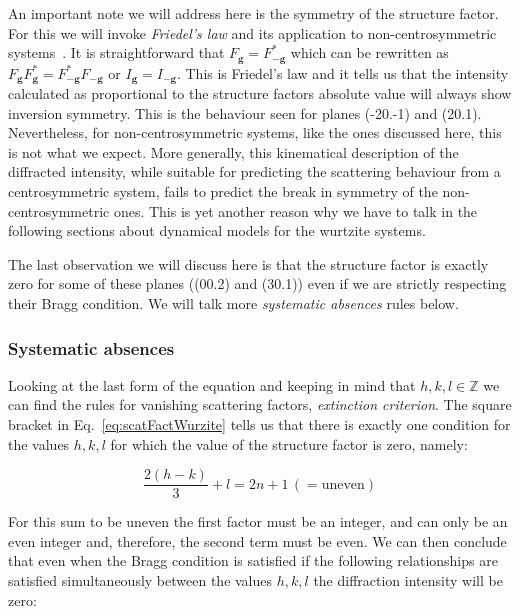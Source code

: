 An important note we will address here is the symmetry of the structure factor. For this we will invoke \textit{Friedel's law} and its application to non-centrosymmetric systems~\cite{Serneels73}. It is straightforward that $F_\mathbf{g}=F^*_{-\mathbf{g}}$ which can be rewritten as $F_\mathbf{g} F^*_\mathbf{g}=F^*_{-\mathbf{g}}F_{-\mathbf{g}}$ or $I_\mathbf{g}=I_\mathbf{-g}$. This is Friedel's law and it tells us that the intensity calculated as proportional to the structure factors absolute value will always show inversion symmetry. This is the behaviour seen for planes \hkl(-20.-1) and \hkl(20.1). Nevertheless, for non-centrosymmetric systems, like the ones discussed here, this is not what we expect. More generally, this kinematical description of the diffracted intensity, while suitable for predicting the scattering behaviour from a centrosymmetric system, fails to predict the break in symmetry of the non-centrosymmetric ones.  This is yet another reason why we have to talk in the following sections about dynamical models for the wurtzite systems. 


The last observation we will discuss here is that the structure factor is exactly zero for some of these planes (\hkl(00.2) and \hkl(30.1)) even if we are strictly respecting their Bragg condition. We will talk more \textit{systematic absences} rules below. 


\subsubsection{Systematic absences }

 Looking at the last form of the equation and keeping in mind that $h,k,l \in  \mathbb{Z}$ we can find the rules for vanishing scattering factors, \ie \emph{extinction criterion}. The square bracket in Eq.~\ref{eq:scatFactWurzite} tells us that there is exactly one condition for the values $h,k,l$ for which the value of the structure factor is zero, namely:
 
 \begin{equation*}
     \frac{2(h-k)}{3} + l  = 2n+1 \, ( = \text{uneven})
 \end{equation*}

For this sum to be uneven the first factor must be an integer, and can only be an even integer and, therefore, the second term must be even. We can then conclude that even when the Bragg condition is satisfied if the following relationships are satisfied simultaneously between the values $h, k, l$ the diffraction intensity will be zero:

